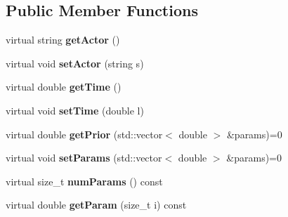 \subsection*{Public Member Functions}
\begin{DoxyCompactItemize}
\item 
\hypertarget{classCartWheel_1_1ExtendedAction_aa4d3fb980184768b1d1bbc6ea69f423f}{
virtual string {\bfseries getActor} ()}
\label{classCartWheel_1_1ExtendedAction_aa4d3fb980184768b1d1bbc6ea69f423f}

\item 
\hypertarget{classCartWheel_1_1ExtendedAction_a70095b234f68ee83d453098484260acb}{
virtual void {\bfseries setActor} (string s)}
\label{classCartWheel_1_1ExtendedAction_a70095b234f68ee83d453098484260acb}

\item 
\hypertarget{classCartWheel_1_1ExtendedAction_ab941fe9c80341ae52e6eb621b77efe8b}{
virtual double {\bfseries getTime} ()}
\label{classCartWheel_1_1ExtendedAction_ab941fe9c80341ae52e6eb621b77efe8b}

\item 
\hypertarget{classCartWheel_1_1ExtendedAction_ace02d8bd56cde28483c75cb32bacac6f}{
virtual void {\bfseries setTime} (double l)}
\label{classCartWheel_1_1ExtendedAction_ace02d8bd56cde28483c75cb32bacac6f}

\item 
\hypertarget{classCartWheel_1_1ExtendedAction_a74caa0d2f8888ec0f95cfeb3477d0bc7}{
virtual double {\bfseries getPrior} (std::vector$<$ double $>$ \&params)=0}
\label{classCartWheel_1_1ExtendedAction_a74caa0d2f8888ec0f95cfeb3477d0bc7}

\item 
\hypertarget{classCartWheel_1_1ExtendedAction_a000cd234124034dcac10572932286f8a}{
virtual void {\bfseries setParams} (std::vector$<$ double $>$ \&params)=0}
\label{classCartWheel_1_1ExtendedAction_a000cd234124034dcac10572932286f8a}

\item 
\hypertarget{classCartWheel_1_1ExtendedAction_a40f09724ad5812b7fd84ef21ba6a2666}{
virtual size\_\-t {\bfseries numParams} () const }
\label{classCartWheel_1_1ExtendedAction_a40f09724ad5812b7fd84ef21ba6a2666}

\item 
\hypertarget{classCartWheel_1_1ExtendedAction_a002fe716e518dde60f160250f62d7b0c}{
virtual double {\bfseries getParam} (size\_\-t i) const }
\label{classCartWheel_1_1ExtendedAction_a002fe716e518dde60f160250f62d7b0c}


\end{DoxyCompactItemize}
